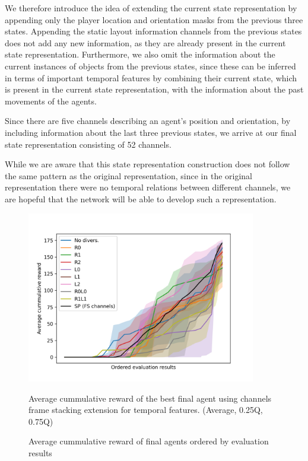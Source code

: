 We therefore introduce the idea of extending the current state representation by appending only the player location and orientation masks from the previous three states.
Appending the static layout information channels from the previous states does not add any new information, as they are already present in the current state representation.
Furthermore, we also omit the information about the current instances of objects from the previous states, since these can be inferred in terms of important temporal features by combining their current state, which is present in the current state representation, with the information about the past movements of the agents.

Since there are five channels describing an agent's position and orientation, by including information about the last three previous states, we arrive at our final state representation consisting of 52 channels.

While we are aware that this state representation construction does not follow the same pattern as the original representation, since in the original representation there were no temporal relations between different channels, we are hopeful that the network will be able to develop such a representation.

\begin{figure}[!ht]
    \centering
    \includegraphics*[width=10cm]{../img/FSChannelsOrderedAvg.png}

    \caption{Average cummulative reward of final agents ordered by evaluation results}
    \label{FSChannelsOrderedAvg}
    \medskip
    \small 
    Average cummulative reward of the best final agent using channels frame stacking extension for temporal features.    
    (Average, 0.25Q, 0.75Q)

\end{figure}

